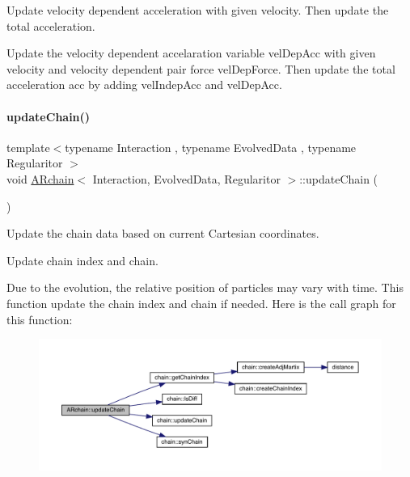 Update velocity dependent acceleration with given velocity. Then update the total acceleration. 

Update the velocity dependent accelaration variable \textquotesingle{}vel\+Dep\+Acc\textquotesingle{} with given velocity and velocity dependent pair force \textquotesingle{}vel\+Dep\+Force\textquotesingle{}. Then update the total acceleration \textquotesingle{}acc\textquotesingle{} by adding \textquotesingle{}vel\+Indep\+Acc\textquotesingle{} and \textquotesingle{}vel\+Dep\+Acc\textquotesingle{}. \mbox{\label{class_a_rchain_ad576df000b6d9f3948eae2793c6b3c54}} 
\paragraph{\texorpdfstring{update\+Chain()}{updateChain()}}
{\footnotesize\ttfamily template$<$typename Interaction , typename Evolved\+Data , typename Regularitor $>$ \\
void \mbox{\hyperlink{class_a_rchain}{A\+Rchain}}$<$ Interaction, Evolved\+Data, Regularitor $>$\+::update\+Chain (\begin{DoxyParamCaption}{ }\end{DoxyParamCaption})\hspace{0.3cm}{\ttfamily [private]}}



Update the chain data based on current Cartesian coordinates. 

Update chain index and chain.

Due to the evolution, the relative position of particles may vary with time. This function update the chain index and chain if needed. Here is the call graph for this function\+:\nopagebreak
\begin{figure}[H]
\begin{center}
\leavevmode
\includegraphics[width=350pt]{class_a_rchain_ad576df000b6d9f3948eae2793c6b3c54_cgraph}
\end{center}
\end{figure}
\mbox{\label{class_a_rchain_a08ddf32fb537ac1556b2e4560abf3b5d}} 
